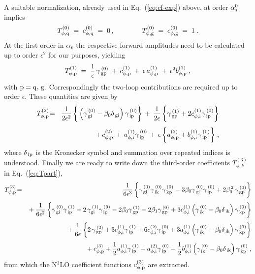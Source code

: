 \documentclass[12pt]{article}
\newcommand{\beq}{\begin{equation}}
\newcommand{\eeq}{\end{equation}}
\newcommand{\bea}{\begin{eqnarray}}
\newcommand{\eea}{\end{eqnarray}}
\newcommand{\nn}{\nonumber}
\newcommand{\as}{\alpha_{\rm s}}
\newcommand{\ep}{\epsilon}
\begin{document}
A suitable normalization, already used in Eq.~(\ref{eq:cf-exp}) above, at order
$\as^0$ implies  
%
\beq
\label{eq:Tphi0}
  T_{\phi,\rm q}^{(0)} \; = \; c_{\phi,\rm q}^{(0)} \; = \; 0 
  \, , \qquad\qquad
  T_{\phi,\rm g}^{(0)} \; = \; c_{\phi,\rm g}^{(0)} \; = \; 1 
  \; .
\eeq
%
At the first order in $\as$ the respective forward amplitudes need to be 
calculated up to order $\ep^2$ for our purposes, yielding
%
\beq
\label{eq:Tphi1}
  T_{\phi, \rm p}^{(1)} \; = \; 
  \frac{1}{\ep}\, \gamma_{\,\rm gp}^{\,(0)} \: + \: c_{\phi,\rm p}^{(1)} 
  \: + \: \ep\, a_{\phi,\rm p}^{(1)} \: + \: \ep^2 b_{\phi,\rm p}^{(1)} 
  \; ,
\eeq 
%
with $\rm p = q,\, g$. 
Correspondingly the two-loop contributions are required up to order $\ep$. 
These quantities are given by
%
\bea
\label{eq:Tphi2}
  T_{\phi,\rm p}^{(2)} 
  &\!=\!& 
  \frac{1}{2 \ep^2}\, \bigg\{
  \left( \gamma^{\,(0)}_{\,\rm{gi}} - \beta_0 \delta_{\,\rm gi} \right) 
    \gamma^{\,(0)}_{\,\rm{ip}} \bigg\}
  \, + \, \frac{1}{2 \ep}\, \bigg\{ \gamma^{\,(1)}_{\,\rm{gp}} 
     + 2 c^{(1)}_{\phi,{\rm{i}}} \gamma^{\,(0)}_{\,\rm{ip}} 
    \bigg\}
  \\[1mm]
  & &
  \, +\,  c^{(2)}_{\phi,{\rm{p}}} 
  \, +\,  a^{(1)}_{\phi,{\rm{i}}} \gamma^{\,(0)}_{\,\rm{ip}} 
  \, +\,  \ep\, \bigg\{
  a^{(2)}_{\phi,{\rm{p}}} 
  + b^{(1)}_{\phi,{\rm{i}}} \gamma^{\,(0)}_{\,\rm{ip}} 
  \bigg\}
  \; ,
  \nn
\eea
%
where $\delta_{\,\rm ip}$ is the Kronecker symbol and summation over repeated
indices is understood. Finally we are ready to write down the third-order 
coefficients $T_{\phi,k}^{(3)}$ in Eq.~(\ref{eq:Tpart}), 
%
\bea
\label{eq:Tphi3}
  T_{\phi,\rm p}^{(3)}   &\!=\!& 
  \frac{1}{6 \ep^3} \,
  \bigg\{ \gamma^{\,(0)}_{\,\rm{gi}} \gamma^{\,(0)}_{\,\rm{ik}} 
       \gamma^{\,(0)}_{\,\rm{kp}} 
     - 3 \beta_0 \gamma^{\,(0)}_{\,\rm{gi}} \gamma^{\,(0)}_{\,\rm{ip}} 
     + 2 \beta_0^{\,2}\, \gamma^{\,(0)}_{\,\rm{gp}} 
  \bigg\} 
\nn \\[1mm] & & \mbox{}
  + \frac{1}{6 \ep^2}\, 
  \bigg\{ \gamma^{\,(0)}_{\,\rm{gi}} \gamma^{\,(1)}_{\,\rm{ip}} 
     + 2\, \gamma^{\,(1)}_{\rm{gi}} \gamma^{\,(0)}_{\,\rm{ip}}
     - 2 \beta_0 \gamma^{\,(1)}_{\,\rm{gp}} 
     - 2 \beta_1 \gamma^{\,(0)}_{\,\rm{gp}}
     + 3 c^{(1)}_{\phi,{\rm{i}}} \left( \gamma^{\,(0)}_{\,\rm{ik}} 
       - \beta_0 \delta_{\,\rm ik} \right) \gamma^{\,(0)}_{\,\rm{kp}} 
  \bigg\}
\nn \\[1mm] & & \mbox{}
  + \frac{1}{6 \ep}\, 
  \bigg\{2\, \gamma^{\,(2)}_{\,\rm{gp}} 
    + 3 c^{(1)}_{\phi,{\rm{i}}} \gamma^{\,(1)}_{\,\rm{ip}} 
    + 6 c^{(2)}_{\phi,{\rm{i}}} \gamma^{\,(0)}_{\,\rm{ip}} 
    + 3 a^{(1)}_{\phi,{\rm{i}}} \left( \gamma^{\,(0)}_{\,\rm{ik}} 
      - \beta_0 \delta_{\,\rm ik} \right) \gamma^{\,(0)}_{\,\rm{kp}} 
  \bigg\}
\nn \\[1mm] & & \mbox{}
  + c^{(3)}_{\phi,{\rm{p}}} 
  + {1 \over 2} a^{(1)}_{\phi,{\rm{i}}} \gamma^{\,(1)}_{\,\rm{ip}} 
  + a^{(2)}_{\phi,{\rm{i}}} \gamma^{\,(0)}_{\,\rm{ip}} 
  + {1 \over 2} b^{(1)}_{\phi,{\rm{i}}} \left( \gamma^{\,(0)}_{\,\rm{ik}} 
    - \beta_0 \delta_{\,\rm ik} \right) \gamma^{\,(0)}_{\,\rm{kp}} 
  \; ,
\eea
%
from which the N$^3$LO coefficient functions $c^{(3)}_{\phi,{\rm{p}}}$ are
extracted.
\end{document}
